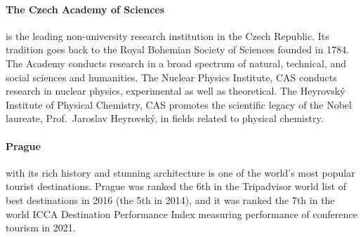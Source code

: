 \documentclass[12pt]{extarticle}
\begin{document}
\paragraph{The Czech Academy of Sciences} is the leading
non-university research institution in the Czech Republic. Its
tradition goes back to the Royal Bohemian Society of Sciences founded
in 1784. The Academy conducts
research in a broad spectrum of natural, technical, and social
sciences and humanities.
The Nuclear Physics Institute, CAS
conducts research in
nuclear physics, experimental as well as theoretical.
%
The Heyrovský Institute of Physical Chemistry, CAS promotes the
scientific legacy of the Nobel laureate, Prof.~Jaroslav Heyrovský, in
fields related to physical chemistry.

\paragraph{Prague} with its rich history and stunning architecture is
one of the world's most popular tourist destinations.
Prague was ranked the 6th in the Tripadvisor world list of best
destinations in 2016 (the 5th in 2014), and it was ranked the 7th in
the world ICCA Destination Performance Index measuring performance of
conference tourism in 2021.
\end{document}
